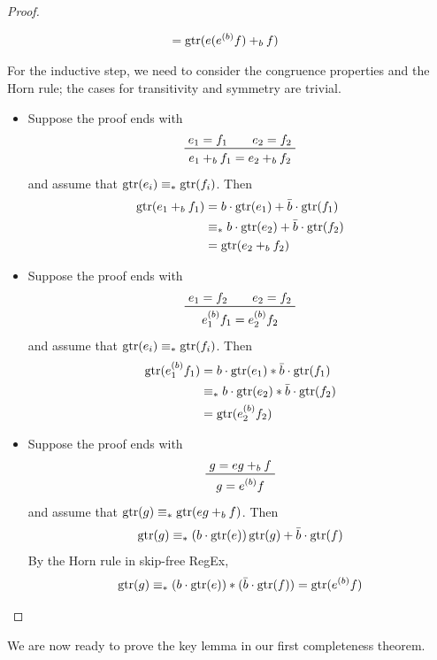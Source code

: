 \documentclass[orivec,envcountsect,envcountsame]{llncs}
\begin{document}
\begin{proof}
\begin{itemize}
\begin{align*}
			&= \operatorname{gtr}(e(e ^{(b)} f) +_b f)
		\end{align*}
	\end{itemize}
	For the inductive step, we need to consider the congruence properties and the Horn rule; the cases for transitivity and symmetry are trivial.
	\begin{itemize}
		\item[(\(+_b\))] Suppose the proof ends with
		\[
		\prftree{e_1 = f_1 \qquad e_2 = f_2}{e_1 +_b f_1 = e_2 +_b f_2}
		\]
		and assume that \(\operatorname{gtr}(e_i) \equiv_* \operatorname{gtr}(f_i)\).
		Then
		\begin{align*}
			\operatorname{gtr}(e_1 +_b f_1)
			&= b\cdot\operatorname{gtr}(e_1) + \bar b\cdot\operatorname{gtr}(f_1) \\
			&\equiv_* b\cdot\operatorname{gtr}(e_2) + \bar b\cdot\operatorname{gtr}(f_2) \\
			&= \operatorname{gtr}(e_2 +_b f_2)
		\end{align*}

		\item[(\(^{(b)}\))] Suppose the proof ends with
		\[
		\prftree{e_1 = f_2 \qquad e_2 = f_2}{e_1 ^{(b)} f_1 = e_2 ^{(b)} f_2}
		\]
		and assume that \(\operatorname{gtr}(e_i) \equiv_* \operatorname{gtr}(f_i)\).
		Then
		\begin{align*}
			\operatorname{gtr}(e_1 ^{(b)} f_1)
			&= b\cdot\operatorname{gtr}(e_1) * \bar b\cdot\operatorname{gtr}(f_1) \\
			&\equiv_* b\cdot\operatorname{gtr}(e_2) * \bar b\cdot\operatorname{gtr}(f_2) \\
			&= \operatorname{gtr}(e_2 ^{(b)} f_2)
		\end{align*}
		\item Suppose the proof ends with
		\[
		\prftree{g = eg +_b f}{g = e ^{(b)} f}
		\]
		and assume that \(\operatorname{gtr}(g) \equiv_* \operatorname{gtr}(eg +_b f)\).
		Then
		\[
		\operatorname{gtr}(g) \equiv_* (b\cdot\operatorname{gtr}(e))\operatorname{gtr}(g) + \bar b\cdot\operatorname{gtr}(f)
		\]
		By the Horn rule in skip-free \textsf{RegEx},
		\[
		\operatorname{gtr}(g) \equiv_* (b\cdot\operatorname{gtr}(e)) * (\bar b\cdot\operatorname{gtr}(f)) = \operatorname{gtr}(e^{(b)} f)
		\]
	\end{itemize}
\end{proof}

We are now ready to prove the key lemma in our first completeness theorem.

\lemprovableretract*
\end{document}
